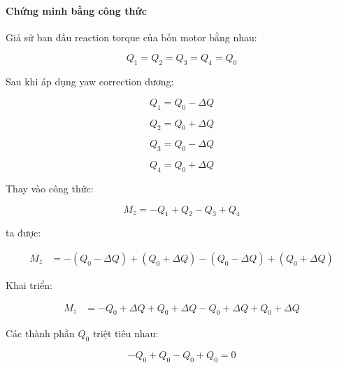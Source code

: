 \paragraph{Chứng minh bằng công thức}

Giả sử ban đầu reaction torque của bốn motor bằng nhau:

\begin{equation}
    Q_1 = Q_2 = Q_3 = Q_4 = Q_0
\end{equation}

Sau khi áp dụng yaw correction dương:

\begin{equation}
    Q_1 = Q_0 - \Delta Q
\end{equation}

\begin{equation}
    Q_2 = Q_0 + \Delta Q
\end{equation}

\begin{equation}
    Q_3 = Q_0 - \Delta Q
\end{equation}

\begin{equation}
    Q_4 = Q_0 + \Delta Q
\end{equation}

Thay vào công thức:

\begin{equation}
    M_z = -Q_1 + Q_2 - Q_3 + Q_4
\end{equation}

ta được:

\begin{equation}
\begin{aligned}
    M_z
    &=
    -(Q_0-\Delta Q)
    +(Q_0+\Delta Q)
    -(Q_0-\Delta Q)
    +(Q_0+\Delta Q)
\end{aligned}
\end{equation}

Khai triển:

\begin{equation}
\begin{aligned}
    M_z
    &=
    -Q_0+\Delta Q
    +Q_0+\Delta Q
    -Q_0+\Delta Q
    +Q_0+\Delta Q
\end{aligned}
\end{equation}

Các thành phần $Q_0$ triệt tiêu nhau:

\begin{equation}
    -Q_0 + Q_0 - Q_0 + Q_0 = 0
\end{equation}

